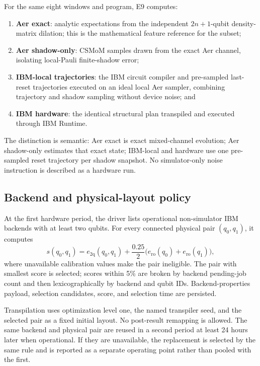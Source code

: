For the same eight windows and program, E9 computes:
\begin{enumerate}
  \item \textbf{Aer exact}: analytic expectations from the independent
        \(2n+1\)-qubit density-matrix dilation; this is the mathematical
        feature reference for the subset;
  \item \textbf{Aer shadow-only}: CSMoM samples drawn from the exact Aer channel,
        isolating local-Pauli finite-shadow error;
  \item \textbf{IBM-local trajectories}: the IBM circuit compiler and
        pre-sampled last-reset trajectories executed on an ideal local Aer
        sampler, combining trajectory and shadow sampling without device noise;
        and
  \item \textbf{IBM hardware}: the identical structural plan transpiled and
        executed through IBM Runtime.
\end{enumerate}
The distinction is semantic: Aer exact is exact mixed-channel evolution; Aer
shadow-only estimates that exact state; IBM-local and hardware use one
pre-sampled reset trajectory per shadow snapshot.  No simulator-only noise
instruction is described as a hardware run.

\subsection{Backend and physical-layout policy}
\label{app:hardware-selection}

At the first hardware period, the driver lists operational non-simulator IBM
backends with at least two qubits.  For every connected physical pair
\((q_0,q_1)\), it computes
\[
 s(q_0,q_1)
 =e_{2\mathrm q}(q_0,q_1)
  +\frac{0.25}{2}\bigl(e_{\mathrm{ro}}(q_0)+e_{\mathrm{ro}}(q_1)\bigr),
\]
where unavailable calibration values make the pair ineligible.  The pair with
smallest score is selected; scores within 5\% are broken by backend pending-job
count and then lexicographically by backend and qubit IDs.  Backend-properties
payload, selection candidates, score, and selection time are persisted.

Transpilation uses optimization level one, the named transpiler seed, and the
selected pair as a fixed initial layout.  No post-result remapping is allowed.
The same backend and physical pair are reused in a second period at least 24
hours later when operational.  If they are unavailable, the replacement is
selected by the same rule and is reported as a separate operating point rather
than pooled with the first.

